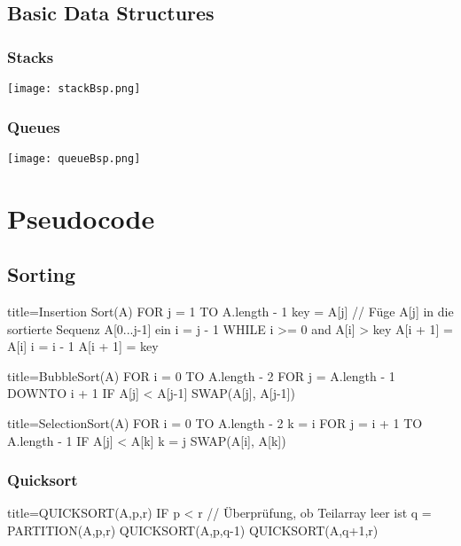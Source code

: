         \subsection{Basic Data Structures}

        \subsubsection{Stacks}
        \centerline{\texttt{[image: stackBsp.png]}}

        \subsubsection{Queues}
        \centerline{\texttt{[image: queueBsp.png]}}

\pagebreak

\section{Pseudocode}
    \subsection{Sorting}
        \begin{ccode}[autogobble]{title=Insertion Sort(A)}  
            FOR j = 1 TO A.length - 1
            key = A[j]
            // Füge A[j] in die sortierte Sequenz A[0...j-1] ein
            i = j - 1
            WHILE i >= 0 and A[i] > key
                A[i + 1] = A[i]
                i = i - 1
            A[i + 1] = key
        \end{ccode}

        \begin{ccode}[autogobble]{title=BubbleSort(A)}  
            FOR i = 0 TO A.length - 2
                FOR j = A.length - 1 DOWNTO i + 1
                    IF A[j] < A[j-1]
                        SWAP(A[j], A[j-1])
            \end{ccode}
        
            \begin{ccode}[autogobble]{title=SelectionSort(A)}
            FOR i = 0 TO A.length - 2
                k = i 
                FOR j = i + 1 TO A.length - 1
                    IF A[j] < A[k]
                        k = j 
                SWAP(A[i], A[k])
            \end{ccode}
                
        \subsubsection{Quicksort}
            \begin{ccode}[autogobble,escapeinside=||]{title={QUICKSORT(A,p,r)}}
            IF p < r    // Überprüfung, ob Teilarray leer ist
                q = PARTITION(A,p,r)
                QUICKSORT(A,p,q-1)
                QUICKSORT(A,q+1,r)
            \end{ccode}
        
